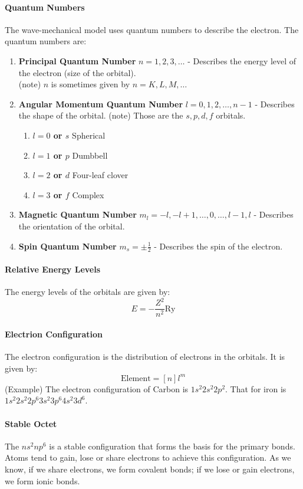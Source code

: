 \documentclass[11pt]{report}
\begin{document}
\paragraph{Quantum Numbers} The wave-mechanical model uses quantum numbers to describe the electron. The quantum numbers are:   
\begin{enumerate}
    \item \textbf{Principal Quantum Number} $n = 1,2,3,\dots$ - Describes the energy level of the electron (size of the orbital). \\
    (note) $n$ is sometimes given by $n = K, L, M, \dots$
    \item \textbf{Angular Momentum Quantum Number} $l = 0,1,2,\dots,n-1$ - Describes the shape of the orbital.
    (note) Those are the $s,p,d,f$ orbitals.
    \begin{enumerate}
        \item \textbf{$l=0$ or $s$} Spherical
        \item \textbf{$l=1$ or $p$} Dumbbell
        \item \textbf{$l=2$ or $d$} Four-leaf clover
        \item \textbf{$l=3$ or $f$} Complex
    \end{enumerate}
    \item \textbf{Magnetic Quantum Number} $m_l = -l, -l+1, \dots, 0, \dots, l-1, l$ - Describes the orientation of the orbital.
    \item \textbf{Spin Quantum Number} $m_s = \pm \frac{1}{2}$ - Describes the spin of the electron.
\end{enumerate}
\paragraph{Relative Energy Levels} The energy levels of the orbitals are given by:
\begin{equation}
    E = -\frac{Z^2}{n^2} \text{Ry}
\end{equation}
\paragraph{Electrion Configuration} The electron configuration is the distribution of electrons in the orbitals. It is given by:
\begin{equation}
    \text{Element} = [n]l^m
\end{equation}
(Example) The electron configuration of Carbon is $1s^2 2s^2 2p^2$. That for iron is $1s^2 2s^2 2p^6 3s^2 3p^6 4s^2 3d^6$.
\paragraph{Stable Octet} The $ns^2 np^6$ is a stable configuration that forms the basis for the primary bonds. Atoms tend to gain, lose or share electrons to achieve this configuration. As we know, if we share electrons, we form covalent bonds; if we lose or gain electrons, we form ionic bonds.
\end{document}
